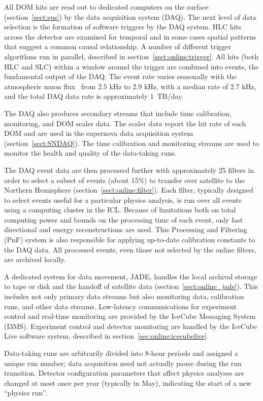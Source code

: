 All DOM hits are read out to dedicated computers on the surface
(section~\ref{sect:sps}) by the data acquisition system (DAQ).  The next level
of data selection is the formation of software triggers by the DAQ
system. HLC hits across the detector are examined 
for temporal and in some cases spatial patterns that suggest a common
causal relationship.  A number of different trigger algorithms run in
parallel, described in section~\ref{sect:online:trigger}.  All hits (both HLC
and SLC) within a window around the trigger are combined into events, the
fundamental output of the DAQ.  The event rate varies
seasonally with the atmospheric muon flux~\cite{ICECUBE:IceTop} from 2.5
kHz to 2.9 kHz, with a median rate of 2.7 kHz, and the total DAQ data rate is
approximately 1~TB/day. 

The DAQ also produces secondary streams that include time calibration,
monitoring, and DOM scaler data.  The scaler data report the
hit rate of each DOM and are used in the supernova data
acquisition system (section~\ref{sect:SNDAQ}).  The time calibration and
monitoring streams are used to monitor the health and quality of the
data-taking runs.

The DAQ event data are then processed further with approximately 25 filters
in order to select a subset of events (about 15\%) to transfer over
satellite to the Northern Hemisphere (section~\ref{sect:online:filter}).  Each
filter, typically designed to select events useful for a particular physics
analysis, is run over all events using a computing cluster in the ICL.
Because of limitations both on total computing power and bounds on the
processing time of each event, only fast directional and energy
reconstructions are used.  This Processing and Filtering (PnF) system is
also responsible for applying up-to-date calibration constants to the DAQ
data. All processed events, even those not selected by the online filters,
are archived locally.

A dedicated system for data movement, JADE, handles the local archival storage to
tape or disk and the handoff of satellite data
(section~\ref{sect:online_jade}).  This includes not only primary data streams
but also monitoring data, calibration runs, and other data streams.
Low-latency communications for experiment control and real-time monitoring
are provided by the IceCube Messaging System (I3MS).  
Experiment control and detector monitoring are handled by the IceCube Live
software system, described in section~\ref{sec:online:icecubelive}.

Data-taking runs are arbitrarily divided into 8-hour periods and assigned
a unique run number; data acquisition need not actually pause during
the run transition.  Detector configuration parameters that affect physics
analyses are changed at most once per year (typically in May), indicating
the start of a new ``physics run''.   

